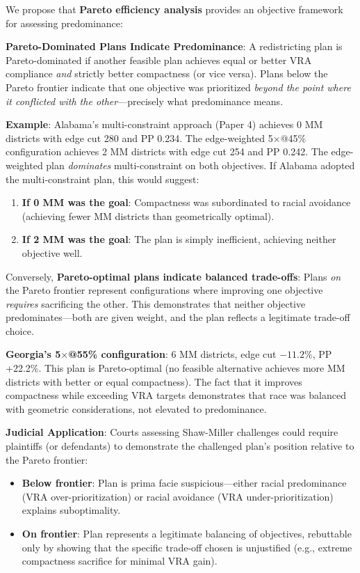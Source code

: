 We propose that \textbf{Pareto efficiency analysis} provides an objective framework for assessing predominance:

\textbf{Pareto-Dominated Plans Indicate Predominance}: A redistricting plan is Pareto-dominated if another feasible plan achieves equal or better VRA compliance \emph{and} strictly better compactness (or vice versa). Plans below the Pareto frontier indicate that one objective was prioritized \emph{beyond the point where it conflicted with the other}---precisely what predominance means.

\textbf{Example}: Alabama's multi-constraint approach (Paper 4) achieves 0 MM districts with edge cut 280 and PP 0.234. The edge-weighted 5$\times$@45\% configuration achieves 2 MM districts with edge cut 254 and PP 0.242. The edge-weighted plan \emph{dominates} multi-constraint on both objectives. If Alabama adopted the multi-constraint plan, this would suggest:
\begin{enumerate}
    \item \textbf{If 0 MM was the goal}: Compactness was subordinated to racial avoidance (achieving fewer MM districts than geometrically optimal).
    \item \textbf{If 2 MM was the goal}: The plan is simply inefficient, achieving neither objective well.
\end{enumerate}

Conversely, \textbf{Pareto-optimal plans indicate balanced trade-offs}: Plans \emph{on} the Pareto frontier represent configurations where improving one objective \emph{requires} sacrificing the other. This demonstrates that neither objective predominates---both are given weight, and the plan reflects a legitimate trade-off choice.

\textbf{Georgia's 5$\times$@55\% configuration}: 6 MM districts, edge cut $-11.2$\%, PP +22.2\%. This plan is Pareto-optimal (no feasible alternative achieves more MM districts with better or equal compactness). The fact that it improves compactness while exceeding VRA targets demonstrates that race was balanced with geometric considerations, not elevated to predominance.

\textbf{Judicial Application}: Courts assessing Shaw-Miller challenges could require plaintiffs (or defendants) to demonstrate the challenged plan's position relative to the Pareto frontier:
\begin{itemize}
    \item \textbf{Below frontier}: Plan is prima facie suspicious---either racial predominance (VRA over-prioritization) or racial avoidance (VRA under-prioritization) explains suboptimality.
    \item \textbf{On frontier}: Plan represents a legitimate balancing of objectives, rebuttable only by showing that the specific trade-off chosen is unjustified (e.g., extreme compactness sacrifice for minimal VRA gain).
\end{itemize}

